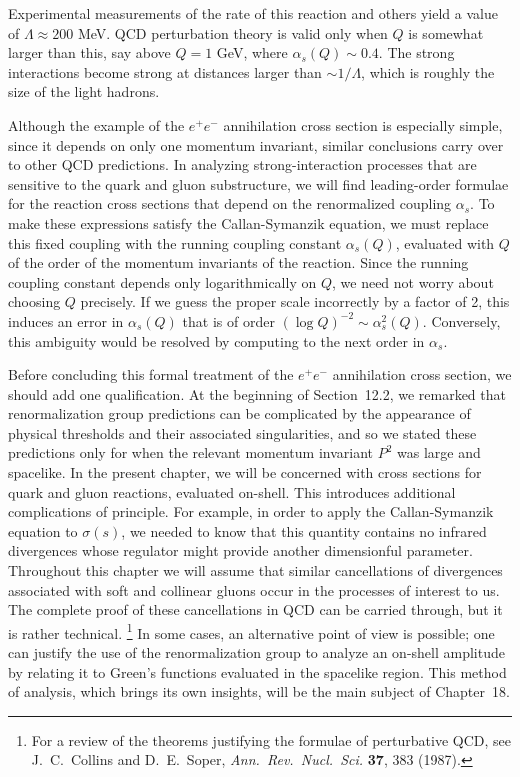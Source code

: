 Experimental measurements of the rate of this reaction and others yield a
value of $\Lambda \approx 200$ MeV.  QCD perturbation theory is valid only
when $Q$ is somewhat larger than this, say above $Q = 1$ GeV, where
$\alpha_s(Q) \sim 0.4$.  The strong interactions become strong at distances
larger than $\sim 1/\Lambda$, which is roughly the size of the light hadrons.

Although the example of the $e^{+}e^{-}$ annihilation cross section is
especially simple, since it depends on only one momentum invariant, similar
conclusions carry over to other QCD predictions.  In analyzing
strong-interaction processes that are sensitive to the quark and gluon
substructure, we will find leading-order formulae for the reaction cross
sections that depend on the renormalized coupling $\alpha_s$.  To make these
expressions satisfy the Callan-Symanzik equation, we must replace this fixed
coupling with the running coupling constant $\alpha_s(Q)$, evaluated with $Q$
of the order of the momentum invariants of the reaction.  Since the running
coupling constant depends only logarithmically on $Q$, we need not worry
about choosing $Q$ precisely.  If we guess the proper scale incorrectly by a
factor of 2, this induces an error in $\alpha_s(Q)$ that is of order
$(\log Q)^{-2} \sim \alpha_s^2(Q)$.  Conversely, this ambiguity would be
resolved by computing to the next order in $\alpha_s$.

Before concluding this formal treatment of the $e^{+}e^{-}$ annihilation
cross section, we should add one qualification.  At the beginning of
Section~12.2, we remarked that renormalization group predictions can be
complicated by the appearance of physical thresholds and their associated
singularities, and so we stated these predictions only for when the relevant
momentum invariant $P^2$ was large and spacelike.  In the present chapter, we
will be concerned with cross sections for quark and gluon reactions, evaluated
on-shell.  This introduces additional complications of principle.  For
example, in order to apply the Callan-Symanzik equation to $\sigma(s)$, we
needed to know that this quantity contains no infrared divergences whose
regulator might provide another dimensionful parameter.  Throughout this
chapter we will assume that similar cancellations of divergences associated
with soft and collinear gluons occur in the processes of interest to us.  The
complete proof of these cancellations in QCD can be carried through, but it
is rather technical.%
\footnote{For a review of the theorems justifying the formulae of perturbative
QCD, see J.~C.~Collins and D.~E.~Soper, \emph{Ann.\ Rev.\ Nucl.\ Sci.}
\textbf{37}, 383 (1987).}  In some cases, an alternative point of view is
possible; one can justify the use of the renormalization group to analyze an
on-shell amplitude by relating it to Green's functions evaluated in the
spacelike region.  This method of analysis, which brings its own insights,
will be the main subject of Chapter~18.

